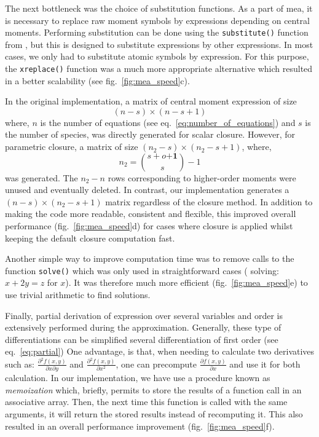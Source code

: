 The next bottleneck was the choice of substitution functions.
As a part of \gls{mea}, it is necessary to replace raw moment symbols by expressions depending on central moments.
Performing substitution can be done using the \texttt{substitute()} function from \sympy, but this is designed to substitute expressions by other expressions.
In most cases, we only had to substitute atomic symbols by expression.
For this purpose, the \texttt{xreplace()} function was a much more appropriate alternative which resulted in a better scalability (see fig.~\ref{fig:mea_speed}c).

In the original implementation, a matrix of central moment expression of size
\[(n-s) \times (n-s + 1)\]
where,
$n$ is the number of equations (see eq.~\ref{eq:number_of_equations}) and
$s$ is the number of species,
was directly generated for scalar closure.
However, for parametric closure, a matrix of size $(n_2-s) \times (n_2-s + 1)$,
where,
\[n_2={{s+o \mathbf{+1}} \choose {s}} -1\]
was generated.
The $n_2 - n$ rows corresponding to higher-order moments were unused and eventually deleted.
In contrast, our implementation generates a $(n-s) \times (n_2-s + 1)$ matrix regardless of the closure method.
In addition to making the code more readable, consistent and flexible, this improved overall performance (fig.~\ref{fig:mea_speed}d)
for cases where closure is applied whilst keeping the default closure computation fast.

Another simple way to improve computation time was to remove calls to the function \texttt{solve()} which was only used in straightforward cases
(\eg{} solving: $x + 2y = z$ for $x$).
It was therefore much more efficient (fig.~\ref{fig:mea_speed}e) to use trivial arithmetic to find solutions.

Finally, partial derivation of expression over several variables and order is extensively performed during the approximation.
Generally, these type of differentiations can be simplified several differentiation of first order (see eq.~\ref{eq:partial})
One advantage, is that, when needing to calculate two derivatives such as: $\frac{\partial{} ^ 2 f(x,y)}{\partial{} x \partial{} y}$ and $\frac{\partial{} ^ 2 f(x,y)}{\partial{} x^2}$,
one can precompute $\frac{\partial{} f(x,y)}{\partial{} x}$ and use it for both calculation.
In our implementation, we have use a procedure known as \emph{memoization} which, briefly, permits to store the results of a function call in an associative array.
Then, the next time this function is called with the same arguments, it will return the stored results instead of recomputing it.
This also resulted in an overall performance improvement (fig.~\ref{fig:mea_speed}f).

